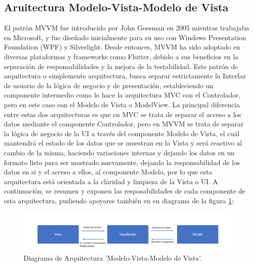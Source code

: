 \subsection{Aruitectura Modelo-Vista-Modelo de Vista}
El patrón MVVM fue introducido por John Gossman en 2005 mientras trabajaba en Microsoft, y fue diseñado inicialmente para su uso
con Windows Presentation Foundation (WPF) y Silverlight. Desde entonces, MVVM ha sido adoptado en diversas plataformas y frameworks como Flutter,
debido a sus beneficios en la separación de responsabilidades y la mejora de la testabilidad.
Este patrón de arquitectura o simplemente arquitectura, busca separar estrictamente la Interfaz de usuario de la lógica de negocio y de presentación, estableciendo un componente
intermedio como lo hace la arquitectura MVC con el Controlador, pero en este caso con el Modelo de Vista o ModelView. La principal diferencia entre estas dos arquitecturas
es que en MVC se trata de separar el acceso a los datos mediante el componente Controlador, pero en MVVM se trata de separar la lógica de negocio de la UI a través del componente
Modelo de Vista, el cuál mantendrá el estado de los datos que se muestran en la Vista y será reactivo al cambio de la misma, haciendo variaciones internas y dejando los datos en
un formato listo para ser mostrado nuevamente, dejando la responsabilidad de los datos en si y el acceso a ellos, al componente Modelo, por lo que esta arquitectura está orientada
a la claridad y limpieza de la Vista o UI. A continuación, se resumen y exponen las resposabilidades de cada componente de esta arquitectura, pudiendo apoyarse también en en diagrama
de la figura \ref{fig:figura14}:

\begin{figure}[h]
    \centering
    \includegraphics[scale=0.35]{Graphics/Capitulo 3/modelo MVVM.png}
    \caption{Diagrama de Arquitectura 'Modelo-Vista-Modelo de Vista'.} %
    \label{fig:figura14}
\end{figure}

